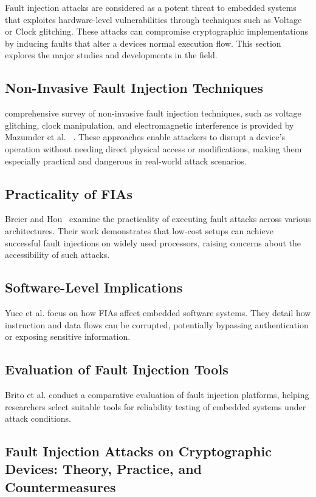 Fault injection attacks are considered as a potent threat to embedded systems that exploites hardware-level vulnerabilities through techniques such as Voltage or Clock glitching. These attacks can compromise cryptographic implementations by inducing faults that alter a devices normal execution flow. This section explores the major studies and developments in the field.

\subsection*{Non-Invasive Fault Injection Techniques}

comprehensive survey of non-invasive fault injection techniques, such as voltage glitching, clock manipulation, and electromagnetic interference is provided by Mazumder et al.~\cite{mazumder2023comprehensive} . These approaches enable attackers to disrupt a device's operation without needing direct physical access or modifications, making them especially practical and dangerous in real-world attack scenarios.

\subsection*{Practicality of FIAs}
Breier and Hou~\cite{breier2022practical} examine the practicality of executing fault attacks across various architectures. Their work demonstrates that low-cost setups can achieve successful fault injections on widely used processors, raising concerns about the accessibility of such attacks.

\subsection*{Software-Level Implications}
Yuce et al.\cite{yuce2020fault} focus on how FIAs affect embedded software systems. They detail how instruction and data flows can be corrupted, potentially bypassing authentication or exposing sensitive information.



\subsection*{Evaluation of Fault Injection Tools}
Brito et al. \cite{brito2023evaluation} conduct a comparative evaluation of fault injection platforms, helping researchers select suitable tools for reliability testing of embedded systems under attack conditions.
\subsection*{Fault Injection Attacks on Cryptographic Devices: Theory, Practice, and Countermeasures}

